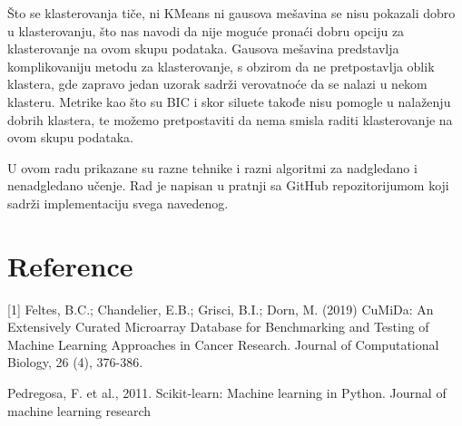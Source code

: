 \documentclass[a4paper]{article}
\begin{document}
    \par
        Što se klasterovanja tiče, ni KMeans ni gausova mešavina se nisu pokazali dobro u klasterovanju, što nas navodi da nije moguće pronaći dobru opciju za klasterovanje na ovom skupu podataka. Gausova mešavina predstavlja komplikovaniju metodu za klasterovanje, s obzirom da ne pretpostavlja oblik klastera, gde zapravo jedan uzorak sadrži verovatnoće da se nalazi u nekom klasteru. Metrike kao što su BIC i skor siluete takođe nisu pomogle u nalaženju dobrih klastera, te možemo pretpostaviti da nema smisla raditi klasterovanje na ovom skupu podataka.

    U ovom radu prikazane su razne tehnike i razni algoritmi za nadgledano i nenadgledano učenje. Rad je napisan u pratnji sa GitHub repozitorijumom koji sadrži implementaciju svega navedenog.
    

\section{Reference}

    [1] Feltes, B.C.; Chandelier, E.B.; Grisci, B.I.; Dorn, M. (2019) CuMiDa: An Extensively Curated Microarray Database for Benchmarking and Testing of Machine Learning Approaches in Cancer Research. Journal of Computational Biology, 26 (4), 376-386. 
    \par
    [2] Pedregosa, F. et al., 2011. Scikit-learn: Machine learning in Python. Journal of machine learning research
\end{document}
